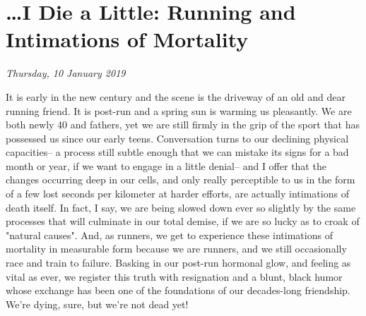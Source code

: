 \chapter{\dots I Die a Little: Running and Intimations of Mortality}
\textit{Thursday, 10 January 2019}
\bigskip

It is early in the new century and the scene is the driveway of an old and dear running friend. It is post-run and a spring sun is warming us pleasantly. We are both newly 40 and fathers, yet we are still firmly in the grip of the sport that has possessed us since our early teens. Conversation turns to our declining physical capacities-- a process still subtle enough that we can mistake its signs for a bad month or year, if we want to engage in a little denial-- and I offer that the changes occurring deep in our cells, and only really perceptible to us in the form of a few lost seconds per kilometer at harder efforts, are actually intimations of death itself. In fact, I say, we are being slowed down ever so slightly by the same processes that will culminate in our total demise, if we are so lucky as to croak of "natural causes". And, as runners, we get to experience these intimations of mortality in measurable form because we are runners, and we still occasionally race and train to failure. Basking in our post-run hormonal glow, and feeling as vital as ever, we register this truth with resignation and a blunt, black humor whose exchange has been one of the foundations of our decades-long friendship. We're dying, sure, but we're not dead yet!

